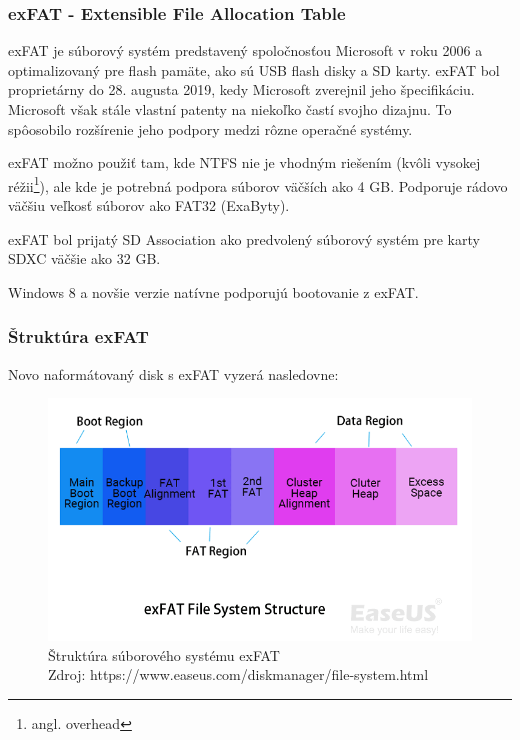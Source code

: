 \documentclass[12pt,oneside,slovak,a4paper]{article}
\begin{document}
\subsubsection{exFAT - Extensible File Allocation Table}
exFAT je súborový systém predstavený spoločnosťou Microsoft v roku 2006 a optimalizovaný pre flash pamäte, ako sú USB flash disky a SD karty. exFAT bol proprietárny do 28. augusta 2019, kedy Microsoft zverejnil jeho špecifikáciu. Microsoft však stále vlastní patenty na niekoľko častí svojho dizajnu. To spôosobilo rozšírenie jeho podpory medzi rôzne operačné systémy.

exFAT možno použiť tam, kde NTFS nie je vhodným riešením (kvôli vysokej réžii\footnote{angl. overhead}), ale kde je potrebná podpora súborov väčších ako 4 GB. Podporuje rádovo väčšiu veľkosť súborov ako FAT32 (ExaByty).

exFAT bol prijatý SD Association ako predvolený súborový systém pre karty SDXC väčšie ako 32 GB.

Windows 8 a novšie verzie natívne podporujú bootovanie z exFAT.

\subsubsection{Štruktúra exFAT}
Novo naformátovaný disk s exFAT vyzerá nasledovne:

\begin{figure}[H]
	\centering
	\captionsetup{justification=centering,margin=2cm}
	\includegraphics[scale=0.55]{./images/file_system_structure/exfat-file-system-structure.png} %
	\centering
	\caption{Štruktúra súborového systému exFAT \\ Zdroj: https://www.easeus.com/diskmanager/file-system.html}
\end{figure}
\end{document}

